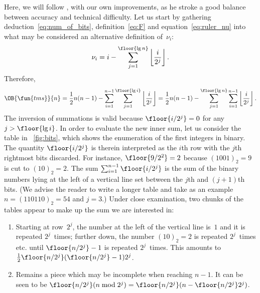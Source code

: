 
Here, we will follow \cite{Fang:2002}, with our own
improvements, as he stroke a good balance between accuracy and
technical difficulty. Let us start by gathering
deduction~\eqref{eq:num_of_bits}, definition~\eqref{eq:F} and
equation~\eqref{eq:ruler_nu} into what may be considered an
alternative definition of~\(\nu_i\):
\begin{equation*}
\abovedisplayskip=2pt
\belowdisplayskip=0pt
\nu_i = i - \sum_{j=1}^{\floor{\lg n}}
\left\lfloor{\frac{i}{2^j}}\right\rfloor.
\end{equation*}
Therefore,
\begin{equation*}
\abovedisplayskip=0pt
\belowdisplayskip=2pt
\OB{\fun{tms}}{n} = \frac{1}{2}n(n-1) -
\sum_{i=1}^{n-1}\sum_{j=1}^{\floor{\lg i}}
\left\lfloor{\frac{i}{2^j}}\right\rfloor
= \frac{1}{2}n(n-1) -
\sum_{j=1}^{\floor{\lg n}}\sum_{i=1}^{n-1}
\left\lfloor{\frac{i}{2^j}}\right\rfloor.
\index{tms@$\OB{\fun{tms}}{n}$}
\end{equation*}
The inversion of summations is valid because \(\floor{i/2^j} = 0\) for
any \(j > \floor{\lg i}\). In order to evaluate the new inner sum, let
us consider the table in \fig~\vref{fig:bits},
which shows the enumeration of the first integers in binary. The
quantity \(\floor{i/2^j}\) is therein interpreted as the \(i\)th row
with the \(j\)th rightmost bits discarded. For instance,
\(\floor{9/2^2} = 2\) because \((1001)_2=9\) is cut to
\((10)_2=2\). The sum \(\sum_{i=1}^{n-1}\floor{i/2^j}\) is the sum of
the binary numbers lying at the left of a vertical line set between
the \(j\)th and \((j+1)\)th bits. (We advise the reader to write a
longer table and take as an example \(n=(110110)_2=54\) and \(j=3\).)
Under close examination, two chunks of the tables appear to make up
the sum we are interested in:
\begin{enumerate}

  \item Starting at row~\(2^j\), the number at the left of the
    vertical line is~\(1\) and it is repeated \(2^j\)~times; further
    down, the number \((10)_2=2\) is repeated \(2^j\)~times etc. until
    \(\floor{n/2^j}-1\) is repeated \(2^j\)~times. This amounts to
    \(\frac{1}{2}\floor{n/2^j}(\floor{n/2^j}-1)2^j\).

  \item Remains a piece which may be incomplete when reaching
    \(n-1\). It can be seen to be \(\floor{n/2^j}(n \bmod{2^j}) =
    \floor{n/2^j}(n-\floor{n/2^j}2^j)\).

\end{enumerate}
